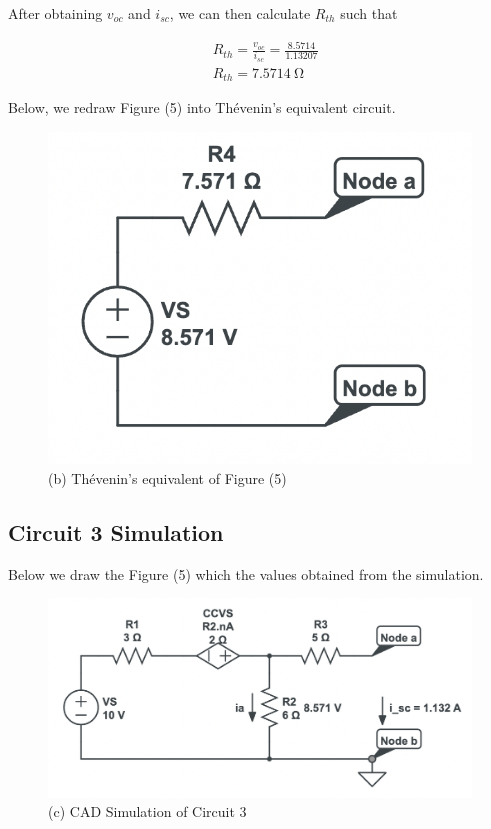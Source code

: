 \documentclass[12pt]{article}
\begin{document}
After obtaining $v_{oc}$ and $i_{sc}$, we can then calculate $R_{th}$ such that

\begin{equation}
    \begin{split}
        &R_{th} = \frac{v_{oc}}{i_{sc}} = \frac{8.5714}{1.13207} \\
        &R_{th} = \SI{7.5714}{\ohm}
    \end{split}
\end{equation}

Below, we redraw Figure (5) into Thévenin's equivalent circuit.

\begin{figure}[H]
    \begin{center}
        \includegraphics[scale=0.6]{circuit-3-v2.png}
        \caption { (b) Thévenin's equivalent of Figure (5) }
    \end{center}
\end{figure}

\subsection{Circuit 3 Simulation}
Below we draw the Figure (5) which the values obtained from the simulation.

\begin{figure}[H]
    \begin{center}
        \includegraphics[scale=0.6]{circuit-3-sol.png}
        \caption { (c) CAD Simulation of Circuit 3 }
    \end{center}
\end{figure}
\end{document}
